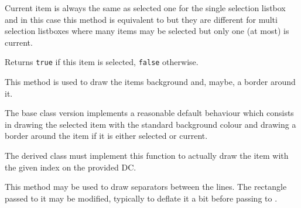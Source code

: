 Current item is always the same as selected one for the single selection
listbox and in this case this method is equivalent to
 but they are different for multi
selection listboxes where many items may be selected but only one (at most) is
current.


\label{wxvlistboxisselected}


Returns {\tt true} if this item is selected, {\tt false} otherwise.


\label{wxvlistboxondrawbackground}


This method is used to draw the items background and, maybe, a border
around it.

The base class version implements a reasonable default behaviour which
consists in drawing the selected item with the standard background
colour and drawing a border around the item if it is either selected or
current.


\label{wxvlistboxondrawitem}


The derived class must implement this function to actually draw the item
with the given index on the provided DC.






\label{wxvlistboxondrawseparator}


This method may be used to draw separators between the lines. The rectangle
passed to it may be modified, typically to deflate it a bit before passing to
.

